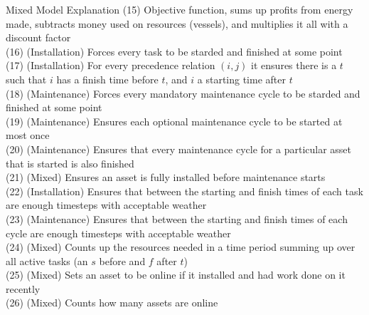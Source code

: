 \documentclass{beamer}
\begin{document}
\begin{frame}{Mixed Model Explanation}
\footnotesize
(15) Objective function, sums up profits from energy made, subtracts money used on resources (vessels), and multiplies it all with a discount factor	\\
(16) (Installation) Forces every task to be starded and finished at some point	\\
(17) (Installation) For every precedence relation $(i, j)$ it ensures there is a $t$ such that $i$ has a finish time before $t$, and $i$ a starting time after $t$	\\
(18) (Maintenance) Forces every mandatory maintenance cycle to be starded and finished at some point	\\
(19) (Maintenance) Ensures each optional maintenance cycle to be started at most once 	\\
(20) (Maintenance)	Ensures that every maintenance cycle for a particular asset that is started is also finished \\
(21) (Mixed) Ensures an asset is fully installed before maintenance starts	\\
(22) (Installation) Ensures that between the starting and finish times of each task are enough timesteps with acceptable weather	\\
(23) (Maintenance) Ensures that between the starting and finish times of each cycle are enough timesteps with acceptable weather	\\
(24) (Mixed) Counts up the resources needed in a time period summing up over all active tasks (an $s$ before and $f$ after $t$)	\\
(25) (Mixed) Sets an asset to be online if it installed and had work done on it recently \\
(26) (Mixed) Counts how many assets are online	
\end{frame}
\end{document}
